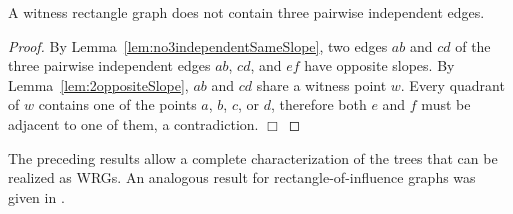 \documentclass{llncs}
\begin{document}
\begin{lemma}
  \label{lem:no3independent}
  A witness rectangle graph does not contain three pairwise independent edges.
\end{lemma}

\begin{proof}
  By Lemma~\ref{lem:no3independentSameSlope}, two edges $ab$ and $cd$
  of the three pairwise independent edges $ab$, $cd$, and $ef$ have
  opposite slopes.  By Lemma~\ref{lem:2oppositeSlope}, $ab$ and $cd$
  share a witness point $w$.  Every quadrant of $w$ contains one of
  the points $a$, $b$, $c$, or $d$, therefore both $e$ and $f$ must be
  adjacent to one of them, a contradiction.  \hfill $\Box$
\end{proof}





The preceding results allow a complete characterization of the trees that can
be realized as WRGs. An analogous result for rectangle-of-influence graphs was
given in \cite{LLMW98}.
\end{document}

